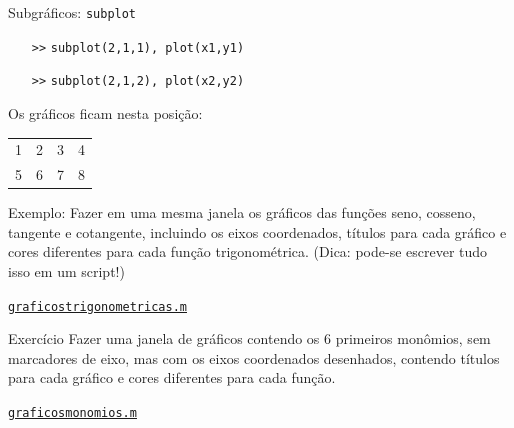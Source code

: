 \documentclass[hyperref={pdfpagelabels=false}]{beamer}
\begin{document}
\begin{frame}{Subgráficos: {\texttt{subplot}}}
  \begin{itemize}
  \item[{\texttt{>>}}] {\texttt{subplot(2,1,1), plot(x1,y1)}}
  \item[{\texttt{>>}}] {\texttt{subplot(2,1,2), plot(x2,y2)}}
  \end{itemize}
  Os gráficos ficam nesta posição:\\
  \begin{center}
    \begin{tabular}{c c c c}
      1 & 2 & 3 & 4\\
      5 & 6 & 7 & 8
    \end{tabular}
  \end{center}
  
  Exemplo: Fazer em uma mesma janela os gráficos das funções seno, cosseno, tangente e cotangente, incluindo os eixos coordenados, títulos para cada gráfico e cores diferentes para cada função trigonométrica. (Dica: pode-se escrever tudo isso em um script!)
  \vfill
  \begin{center} \href{listings/graficostrigonometricas.m}{\underline{\texttt{graficostrigonometricas.m}}} \end{center}
\end{frame}

\begin{frame}{Exercício}
  Fazer uma janela de gráficos contendo os 6 primeiros monômios, sem marcadores de eixo, mas com os eixos coordenados desenhados, contendo títulos para cada gráfico e cores diferentes para cada função.
  \vfill
  \begin{center} \href{listings/graficosmonomios.m}{\underline{\texttt{graficosmonomios.m}}} \end{center}
\end{frame}
\end{document}
